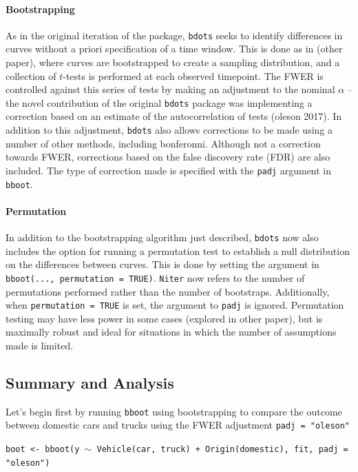 \documentclass{article}
\newcommand{\xt}{\texttt}%
\begin{document}
\paragraph{Bootstrapping} As in the original iteration of the package, \xt{bdots} seeks to identify differences in curves without a priori specification of a time window. This is done as in (other paper), where curves are bootstrapped to create a sampling distribution, and a collection of $t$-tests is performed at  each observed timepoint. The FWER is controlled against this series of tests by making an adjustment to the nominal $\alpha$ -- the novel contribution of the original \xt{bdots} package was implementing a correction based on an estimate of the autocorrelation of tests (oleson 2017). In addition to this adjustment, \xt{bdots} also allows corrections to be made using a number of other methods, including bonferonni. Although not a correction towards FWER, corrections based on the false discovery rate (FDR) are also included. The type of correction made is specified with the \xt{padj} argument in \xt{bboot}.

\paragraph{Permutation} In addition to the bootstrapping algorithm just described, \xt{bdots} now also includes the option for running a permutation test to establish a null distribution on the differences between curves. This is done by setting the argument in \xt{bboot(..., permutation = TRUE)}.  \xt{Niter} now refers to the number of permutations performed rather than the number of bootstraps. Additionally, when \xt{permutation = TRUE} is set, the argument to \xt{padj} is ignored. Permutation testing may have less power in some cases (explored in other paper), but is maximally robust and ideal for situations in which the number of assumptions made is limited.

\subsection{Summary and Analysis}

Let's begin first by running \xt{bboot} using bootstrapping to compare the outcome between domestic cars and trucks using the FWER adjustment \xt{padj = "oleson"}

\begin{center}
\tt boot <- bboot(y $\sim$ Vehicle(car, truck) + Origin(domestic), fit, padj = "oleson")
\end{center}
\end{document}

